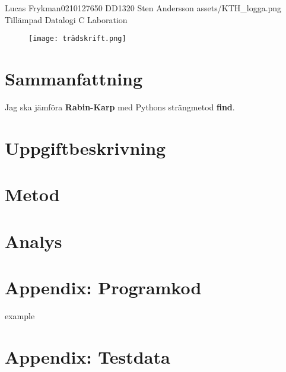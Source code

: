 \documentclass{assignment}
\begin{document}
\assignmentTitle
{Lucas Frykman}{0210127650}
{DD1320}
{Sten Andersson}
{assets/KTH_logga.png}
{Tillämpad Datalogi}
{C Laboration}


\tableofcontents
\begin{figure}[!h]
    \begin{center}
        \texttt{[image: trädskrift.png]}
    \end{center}
\end{figure}
    

\newpage
\section{Sammanfattning}
Jag ska jämföra \textbf{Rabin-Karp} med Pythons strängmetod \textbf{find}. \\
\blindtext

\section{Uppgiftbeskrivning}
\blindtext

\section{Metod}
\blindtext

\section{Analys}
\blindtext

\section{Appendix: Programkod}
\blindtext

 example


\section{Appendix: Testdata}
\blindtext
\end{document}
